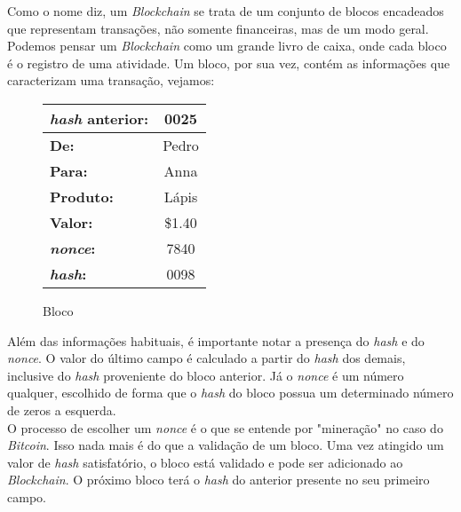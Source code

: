 	Como o nome diz, um \textit{Blockchain} se trata de um conjunto de blocos encadeados que representam transações, não somente financeiras, mas de um modo geral. Podemos pensar um \textit{Blockchain} como um grande livro de caixa, onde cada bloco é o registro de uma atividade. Um bloco, por sua vez, contém as informações que caracterizam uma transação, vejamos:
	
	\begin{figure}[H]
		\centering
		\begin{tabular}{|lc|}
		\hline
		\textbf{\textit{hash} anterior:} & 0025\\
		\hline
		\textbf{De:} & Pedro \\
		\hline
		\textbf{Para:} & Anna \\
		\hline
		\textbf{Produto:} & Lápis \\
		\hline	
		\textbf{Valor:} & \$1.40 \\
		\hline
		\textbf{\textit{nonce}:} & 7840 \\
		\hline
		\textbf{\textit{hash}:} & 0098  \\
		\hline
		\end{tabular}
		\label{fig:blockchain}
		\caption{Bloco}
	\end{figure}
	
	Além das informações habituais, é importante notar a presença do \textit{hash} e do \textit{nonce}. O valor do último campo é calculado a partir do \textit{hash} dos demais, inclusive do \textit{hash} proveniente do bloco anterior. Já o \textit{nonce} é um número qualquer, escolhido de forma que o \textit{hash} do bloco possua um determinado número de zeros a esquerda.\\
	
	O processo de escolher um \textit{nonce} é o que se entende por "mineração" no caso do \textit{Bitcoin}. Isso nada mais é do que a validação de um bloco. Uma vez atingido um valor de \textit{hash} satisfatório, o bloco está validado e pode ser adicionado ao \textit{Blockchain}. O próximo bloco terá o \textit{hash} do anterior presente no seu primeiro campo.\\
	
